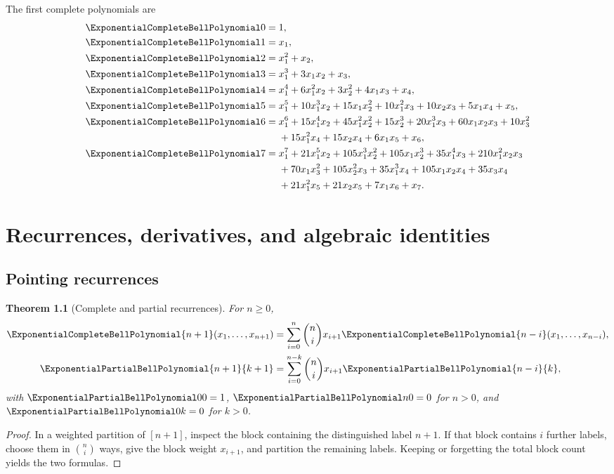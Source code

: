 \documentclass[11pt,a4paper,oneside,openany]{book}
\newtheorem{theorem}{Theorem}[chapter]
\theoremstyle{definition}
\theoremstyle{remark}
\begin{document}
The first complete polynomials are
\begin{align*}
 \ExponentialCompleteBellPolynomial0={}&1,\\
 \ExponentialCompleteBellPolynomial1={}&x_1,\\
 \ExponentialCompleteBellPolynomial2={}&x_1^2+x_2,\\
 \ExponentialCompleteBellPolynomial3={}&x_1^3+3x_1x_2+x_3,\\
 \ExponentialCompleteBellPolynomial4={}&x_1^4+6x_1^2x_2+3x_2^2+4x_1x_3+x_4,\\
 \ExponentialCompleteBellPolynomial5={}&x_1^5+10x_1^3x_2+15x_1x_2^2+10x_1^2x_3
 +10x_2x_3+5x_1x_4+x_5,\\
 \ExponentialCompleteBellPolynomial6={}&x_1^6+15x_1^4x_2+45x_1^2x_2^2+15x_2^3
 +20x_1^3x_3+60x_1x_2x_3+10x_3^2\\
 &+15x_1^2x_4+15x_2x_4+6x_1x_5+x_6,\\
 \ExponentialCompleteBellPolynomial7={}&x_1^7+21x_1^5x_2+105x_1^3x_2^2+105x_1x_2^3
 +35x_1^4x_3+210x_1^2x_2x_3\\
 &+70x_1x_3^2+105x_2^2x_3+35x_1^3x_4+105x_1x_2x_4
 +35x_3x_4\\
 &+21x_1^2x_5+21x_2x_5+7x_1x_6+x_7.
\end{align*}

\chapter{Recurrences, derivatives, and algebraic identities}

\section{Pointing recurrences}
\begin{theorem}[Complete and partial recurrences]\label{thm:bell-poly-recurrences}
For $n\ge0$,
\begin{align}
 \ExponentialCompleteBellPolynomial{n+1}(x_1,\ldots,x_{n+1})
 &=\sum_{i=0}^{n}\binom ni x_{i+1}\ExponentialCompleteBellPolynomial{n-i}(x_1,\ldots,x_{n-i}),
 \label{eq:complete-bell-recurrence}\\
 \ExponentialPartialBellPolynomial{n+1}{k+1}
 &=\sum_{i=0}^{n-k}\binom ni x_{i+1}\ExponentialPartialBellPolynomial{n-i}{k},
 \label{eq:partial-bell-recurrence}
\end{align}
with $\ExponentialPartialBellPolynomial00=1$, $\ExponentialPartialBellPolynomial n0=0$ for $n>0$, and $\ExponentialPartialBellPolynomial0k=0$ for $k>0$.
\end{theorem}
\begin{proof}
In a weighted partition of $[n+1]$, inspect the block containing the distinguished
label $n+1$.  If that block contains $i$ further labels, choose them in $\binom ni$
ways, give the block weight $x_{i+1}$, and partition the remaining labels.  Keeping
or forgetting the total block count yields the two formulas.
\end{proof}
\end{document}
